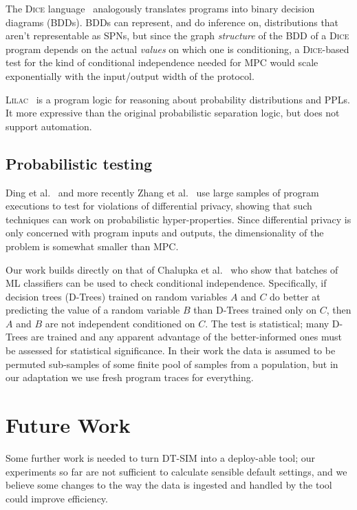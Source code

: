 \documentclass[acmlarge, manuscript, screen, review, anonymous, table]{acmart}
\newcommand{\toolname}{\textsc{DT-SIM}\xspace}
\begin{document}
The \textsc{Dice} language~\cite{holtzen2020scaling} analogously translates programs into binary decision diagrams (BDDs).
BDDs can represent, and do inference on, distributions that aren't representable as SPNs,
but since the graph \emph{structure} of the BDD of a \textsc{Dice} program depends on the actual \emph{values} on which one is conditioning,
a \textsc{Dice}-based test for the kind of conditional independence needed for MPC would scale exponentially with the input/output width of the protocol.

\textsc{Lilac}~\cite{li2023lilac} %
is a program logic for reasoning about probability distributions and PPLs.
It more expressive than the original probabilistic separation logic,
but does not support automation.


\subsection{Probabilistic testing}

Ding et al.~\cite{ding2018detecting} %
and more recently Zhang et al.~\cite{zhang2020testing} %
use large samples of program executions to test for violations of differential privacy,
showing that such techniques can work on probabilistic hyper-properties.
Since differential privacy is only concerned with program inputs and outputs,
the dimensionality of the problem is somewhat smaller than MPC.

Our work builds directly on that of Chalupka et al.~\cite{chalupka2018fast}
who show that batches of ML classifiers can be used to check conditional independence.
Specifically, if decision trees (D-Trees) trained on random variables $A$ and $C$
do better at predicting the value of a random variable $B$ than D-Trees trained only on $C$,
then $A$ and $B$ are not independent conditioned on $C$.
The test is statistical; many D-Trees are trained and any apparent advantage of the better-informed ones must be assessed for statistical significance.
In their work the data is assumed to be permuted sub-samples of some finite pool of samples from a population,
but in our adaptation we use fresh program traces for everything.

\section{Future Work}

Some further work is needed to turn \toolname into a deploy-able tool;
our experiments so far are not sufficient to calculate sensible default settings,
and we believe some changes to the way the data is ingested and handled by the tool could improve efficiency.
\end{document}
